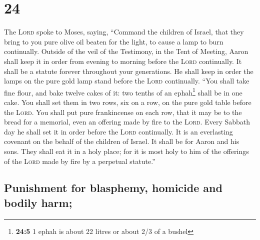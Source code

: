 \hypertarget{section-23}{%
\section{24}\label{section-23}}

 The \textsc{Lord} spoke to Moses, saying, 
``Command the children of Israel, that they bring to you pure olive oil
beaten for the light, to cause a lamp to burn continually.
 Outside of the veil of the Testimony, in the Tent of
Meeting, Aaron shall keep it in order from evening to morning before the
\textsc{Lord} continually. It shall be a statute forever throughout your
generations.  He shall keep in order the lamps on the pure
gold lamp stand before the \textsc{Lord} continually. 
``You shall take fine flour, and bake twelve cakes of it: two tenths of
an ephah\footnote{\textbf{24:5} 1 ephah is about 22 litres or about 2/3
  of a bushel} shall be in one cake.  You shall set them
in two rows, six on a row, on the pure gold table before the
\textsc{Lord}.  You shall put pure frankincense on each
row, that it may be to the bread for a memorial, even an offering made
by fire to the \textsc{Lord}.  Every Sabbath day he shall
set it in order before the \textsc{Lord} continually. It is an
everlasting covenant on the behalf of the children of Israel.
 It shall be for Aaron and his sons. They shall eat it in
a holy place; for it is most holy to him of the offerings of the
\textsc{Lord} made by fire by a perpetual statute.''

\hypertarget{punishment-for-blasphemy-homicide-and-bodily-harm}{%
\subsection{Punishment for blasphemy, homicide and bodily
harm;}\label{punishment-for-blasphemy-homicide-and-bodily-harm}}

